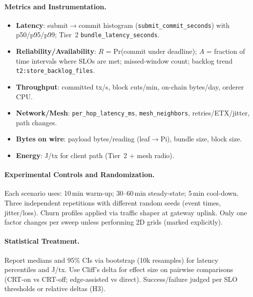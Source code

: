 \documentclass[12pt,onecolumn]{IEEEtran} %
\begin{document}
\paragraph{Metrics and Instrumentation.}
\begin{itemize}[leftmargin=*, itemsep=0.1em]
  \item \textbf{Latency}: submit$\to$commit histogram (\texttt{submit\_commit\_seconds}) with p50/p95/p99; Tier~2 \texttt{bundle\_latency\_seconds}.
  \item \textbf{Reliability/Availability}: $R$ = Pr(commit under deadline); $A$ = fraction of time intervals where SLOs are met; missed-window count; backlog trend \texttt{t2:store\_backlog\_files}.
  \item \textbf{Throughput}: committed tx/s, block cuts/min, on-chain bytes/day, orderer CPU.
  \item \textbf{Network/Mesh}: \texttt{per\_hop\_latency\_ms}, \texttt{mesh\_neighbors}, retries/ETX/jitter, path changes.
  \item \textbf{Bytes on wire}: payload bytes/reading (leaf$\to$Pi), bundle size, block size.
  \item \textbf{Energy}: J/tx for client path (Tier~2 + mesh radio).
\end{itemize}

\paragraph{Experimental Controls and Randomization.}
Each scenario uses: 10\,min warm-up; 30--60\,min steady-state; 5\,min cool-down. Three independent repetitions with different random seeds (event times, jitter/loss). Churn profiles applied via traffic shaper at gateway uplink. Only one factor changes per sweep unless performing 2D grids (marked explicitly).

\paragraph{Statistical Treatment.}
Report medians and 95\% CIs via bootstrap (10k resamples) for latency percentiles and J/tx. Use Cliff’s delta for effect size on pairwise comparisons (CRT-on vs CRT-off; edge-assisted vs direct). Success/failure judged per SLO thresholds or relative deltas (H3).

\end{document}
